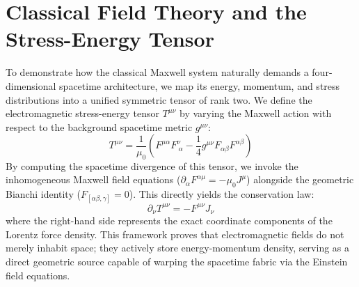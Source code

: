 \documentclass[11pt,a4paper]{article}
\begin{document}
\section{Classical Field Theory and the Stress-Energy Tensor}
To demonstrate how the classical Maxwell system naturally demands a four-dimensional spacetime architecture, we map its energy, momentum, and stress distributions into a unified symmetric tensor of rank two. We define the electromagnetic stress-energy tensor $T^{\mu\nu}$ by varying the Maxwell action with respect to the background spacetime metric $g^{\mu\nu}$:
\begin{equation}
    T^{\mu\nu} = \frac{1}{\mu_0} \left( F^{\mu\alpha} F^{\nu}_{\ \alpha} - \frac{1}{4} g^{\mu\nu} F_{\alpha\beta} F^{\alpha\beta} \right)
\end{equation}
By computing the spacetime divergence of this tensor, we invoke the inhomogeneous Maxwell field equations ($\partial_{\alpha} F^{\alpha\mu} = -\mu_0 J^{\mu}$) alongside the geometric Bianchi identity ($F_{[\alpha\beta,\gamma]} = 0$). This directly yields the conservation law:
\begin{equation}
\partial_{\nu} T^{\mu\nu} = -F^{\mu\nu} J_{\nu}
\end{equation}
where the right-hand side represents the exact coordinate components of the Lorentz force density. This framework proves that electromagnetic fields do not merely inhabit space; they actively store energy-momentum density, serving as a direct geometric source capable of warping the spacetime fabric via the Einstein field equations.
\end{document}
